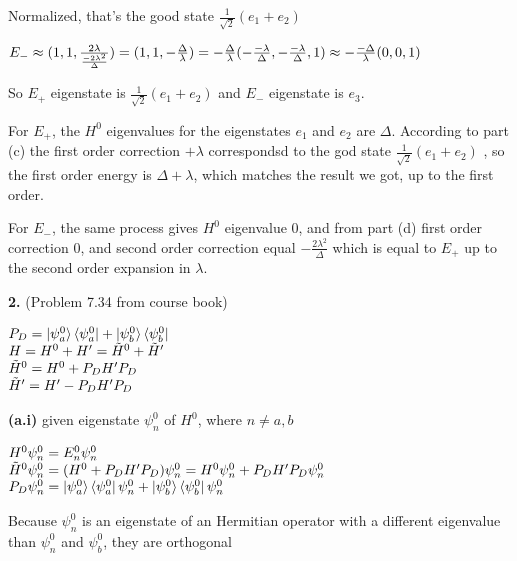 \documentclass[14pt]{extarticle}
\makeatletter
\newenvironment{lefteqs}{%
    \begin{flushleft}%
    \renewcommand{\arraystretch}{1.3}%
    $\begin{array}{@{}l@{}}%
}{%
    \end{array}$%
    \end{flushleft}%
}
\makeatother
\begin{document}
Normalized, that's the good state $\frac{1}{\sqrt{2}}(e_1 + e_2)$

\begin{lefteqs}
    E_- \approx (1,1, \frac{2\lambda}{\frac{-2\lambda^2}{\Delta}}) = (1,1, -\frac{\Delta}{\lambda})
    = -\frac{\Delta}{\lambda} (-\frac{-\lambda}{\Delta}, -\frac{-\lambda}{\Delta}, 1) \approx -\frac{-\Delta}{\lambda} (0,0,1)
\end{lefteqs}

So $E_+$ eigenstate is $\frac{1}{\sqrt{2}}(e_1 + e_2)$ and $E_-$ eigenstate is $e_3$.

For $E_+$, the $H^0$ eigenvalues for the eigenstates $e_1$ and $e_2$ are $\Delta$.
According to part (c) the first order correction $+\lambda$ correspondsd to the god state $\frac{1}{\sqrt{2}}(e_1 + e_2)$
, so the first order energy is $\Delta + \lambda$, which matches the result we got, up to the first order.

For $E_-$, the same process gives $H^0$ eigenvalue 0, and from part (d) first order correction 0,
and second order correction equal $-\frac{2\lambda^2}{\Delta}$ which is equal to $E_+$ up to the second order expansion in $\lambda$.

\newpage

\textbf{\large 2.}
(Problem 7.34 from course book)

\begin{lefteqs}
    P_D = \ket{\psi^0_a} \bra{\psi^0_a} + \ket{\psi^0_b} \bra{\psi^0_b} \\
    H = H^0 + H' = \tilde{H}^0 + \tilde{H}' \\
    \tilde{H}^0 = H^0 + P_D H' P_D \\
    \tilde{H}' = H' - P_D H' P_D \\
\end{lefteqs}

\textbf{(a.i)}
given eigenstate $\psi^0_n$ of $H^0$, where $n\neq a,b$

\begin{lefteqs}
    H^0 \psi^0_n = E^0_n \psi^0_n \\
    \tilde{H}^0 \psi^0_n = (H^0 + P_D H' P_D) \psi^0_n = H^0 \psi^0_n + P_D H' P_D \psi^0_n  \\
    P_D \psi^0_n = \ket{\psi^0_a} \bra{\psi^0_a} \psi^0_n + \ket{\psi^0_b} \bra{\psi^0_b} \psi^0_n \\
\end{lefteqs}

Because $\psi^0_n$ is an eigenstate of an Hermitian operator with a different eigenvalue than $\psi^0_n$ and $\psi^0_b$,
they are orthogonal
\end{document}
